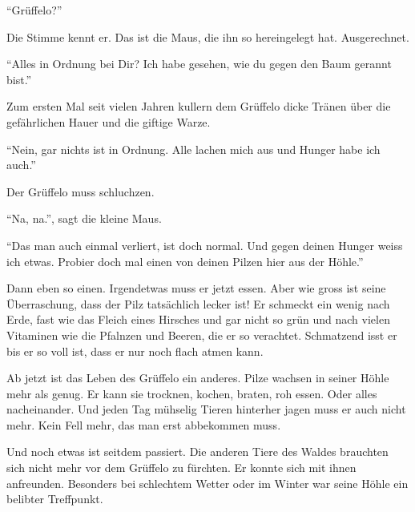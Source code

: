 \enquote{Grüffelo?}

Die Stimme kennt er. Das ist die Maus, die ihn so hereingelegt hat. Ausgerechnet.

\enquote{Alles in Ordnung bei Dir? Ich habe gesehen, wie du gegen den Baum gerannt bist.}

Zum ersten Mal seit vielen Jahren kullern dem Grüffelo dicke Tränen über die gefährlichen Hauer und die giftige Warze. 

\enquote{Nein, gar nichts ist in Ordnung. Alle lachen mich aus und Hunger habe ich auch.}

Der Grüffelo muss schluchzen.

\enquote{Na, na.}, sagt die kleine Maus.

\enquote{Das man auch einmal verliert, ist doch normal. Und gegen deinen Hunger weiss ich etwas. Probier doch mal einen von deinen Pilzen hier aus der Höhle.}



Dann eben so einen. Irgendetwas muss er jetzt essen. Aber wie gross ist seine Überraschung, dass der Pilz tatsächlich lecker ist! Er schmeckt ein wenig nach Erde, fast wie das Fleich eines Hirsches und gar nicht so grün und nach vielen Vitaminen wie die Pfalnzen und Beeren, die er so verachtet. Schmatzend isst er bis er so voll ist, dass er nur noch flach atmen kann.

Ab jetzt ist das Leben des Grüffelo ein anderes. Pilze wachsen in seiner Höhle mehr als genug. Er kann sie trocknen, kochen, braten, roh essen. Oder alles nacheinander. Und jeden Tag mühselig Tieren hinterher jagen muss er auch nicht mehr. Kein Fell mehr, das man erst abbekommen muss. 

Und noch etwas ist seitdem passiert. Die anderen Tiere des Waldes brauchten sich nicht mehr vor dem Grüffelo zu fürchten. Er konnte sich mit ihnen anfreunden. Besonders bei schlechtem Wetter oder im Winter war seine Höhle ein belibter Treffpunkt. 



\vfill

